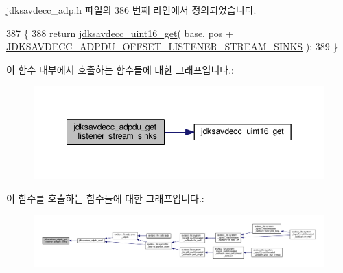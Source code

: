 jdksavdecc\+\_\+adp.\+h 파일의 386 번째 라인에서 정의되었습니다.


\begin{DoxyCode}
387 \{
388     \textcolor{keywordflow}{return} \hyperlink{group__endian_ga3fbbbc20be954aa61e039872965b0dc9}{jdksavdecc\_uint16\_get}( base, pos + 
      \hyperlink{group__adpdu_ga5b292150cb57a8e2ed51e1fc2f1e39ea}{JDKSAVDECC\_ADPDU\_OFFSET\_LISTENER\_STREAM\_SINKS} );
389 \}
\end{DoxyCode}


이 함수 내부에서 호출하는 함수들에 대한 그래프입니다.\+:
\nopagebreak
\begin{figure}[H]
\begin{center}
\leavevmode
\includegraphics[width=349pt]{group__adpdu_ga2530e19495f9c53443ddf229d6ff121f_cgraph}
\end{center}
\end{figure}




이 함수를 호출하는 함수들에 대한 그래프입니다.\+:
\nopagebreak
\begin{figure}[H]
\begin{center}
\leavevmode
\includegraphics[width=350pt]{group__adpdu_ga2530e19495f9c53443ddf229d6ff121f_icgraph}
\end{center}
\end{figure}


